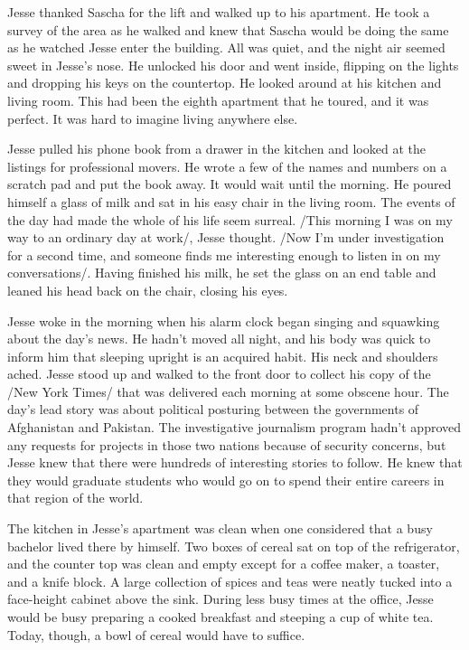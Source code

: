 Jesse thanked Sascha for the lift and walked up to his apartment.  He took a survey of the area as he walked and knew that Sascha would be doing the same as he watched Jesse enter the building.  All was quiet, and the night air seemed sweet in Jesse's nose.  He unlocked his door and went inside, flipping on the lights and dropping his keys on the countertop.  He looked around at his kitchen and living room.  This had been the eighth apartment that he toured, and it was perfect.  It was hard to imagine living anywhere else.

Jesse pulled his phone book from a drawer in the kitchen and looked at the listings for professional movers.  He wrote a few of the names and numbers on a scratch pad and put the book away.  It would wait until the morning.  He poured himself a glass of milk and sat in his easy chair in the living room.  The events of the day had made the whole of his life seem surreal.  /This morning I was on my way to an ordinary day at work/, Jesse thought.  /Now I'm under investigation for a second time, and someone finds me interesting enough to listen in on my conversations/.  Having finished his milk, he set the glass on an end table and leaned his head back on the chair, closing his eyes.


Jesse woke in the morning when his alarm clock began singing and squawking about the day's news.  He hadn't moved all night, and his body was quick to inform him that sleeping upright is an acquired habit.  His neck and shoulders ached.  Jesse stood up and walked to the front door to collect his copy of the /New York Times/ that was delivered each morning at some obscene hour.  The day's lead story was about political posturing between the governments of Afghanistan and Pakistan.  The investigative journalism program hadn't approved any requests for projects in those two nations because of security concerns, but Jesse knew that there were hundreds of interesting stories to follow.  He knew that they would graduate students who would go on to spend their entire careers in that region of the world.

The kitchen in Jesse's apartment was clean when one considered that a busy bachelor lived there by himself.  Two boxes of cereal sat on top of the refrigerator, and the counter top was clean and empty except for a coffee maker, a toaster, and a knife block.  A large collection of spices and teas were neatly tucked into a face-height cabinet above the sink.  During less busy times at the office, Jesse would be busy preparing a cooked breakfast and steeping a cup of white tea.  Today, though, a bowl of cereal would have to suffice.

